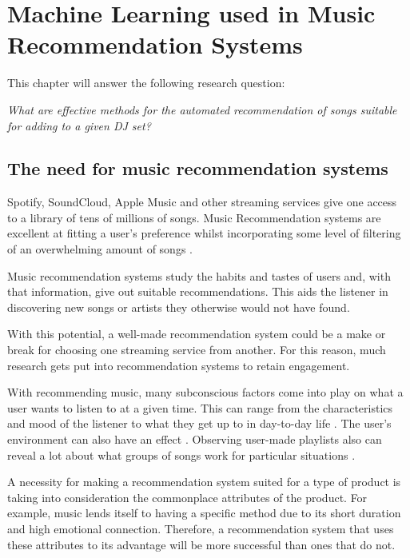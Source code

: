 
\graphicspath{{Chapter2/}}

\chapter{Machine Learning used in Music Recommendation Systems}

This chapter will answer the following research question:

\textit{What are effective methods for the automated recommendation of songs suitable for adding to a given DJ set?} 

\section{The need for music recommendation systems}
Spotify, SoundCloud, Apple Music and other streaming services give one access to a library of tens of millions of songs. Music Recommendation systems are excellent at fitting a user's preference whilst incorporating some level of filtering of an overwhelming amount of songs \citep{bollen_understanding_2010}. 

Music recommendation systems study the habits and tastes of users and, with that information, give out suitable recommendations. This aids the listener in discovering new songs or artists they otherwise would not have found.

With this potential, a well-made recommendation system could be a make or break for choosing one streaming service from another. For this reason, much research gets put into recommendation systems to retain engagement. 

With recommending music, many subconscious factors come into play on what a user wants to listen to at a given time. This can range from the characteristics and mood of the listener to what they get up to in day-to-day life \citep{ferwerda_personality_2015, rentfrow_re_2003, gillhofer_iron_2015, wang_context-aware_2012}.  The user's environment can also have an effect \citep{kaminskas_location-aware_2013}. Observing user-made playlists also can reveal a lot about what groups of songs work for particular situations \citep{zheleva_statistical_2010, mcfee_hypergraph_2012}.

A necessity for making a recommendation system suited for a type of product is taking into consideration the commonplace attributes of the product. For example, music lends itself to having a specific method due to its short duration and high emotional connection. Therefore, a recommendation system that uses these attributes to its advantage will be more successful than ones that do not.

